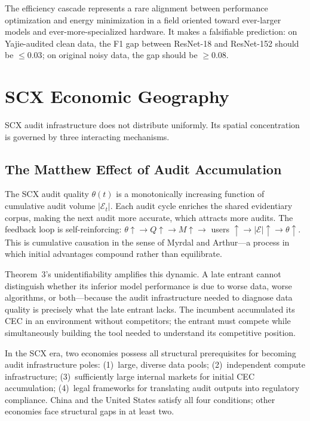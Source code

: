 \documentclass[twocolumn]{article}
\theoremstyle{definition}
\begin{document}
The efficiency cascade represents a rare alignment between performance optimization and energy minimization in a field oriented toward ever-larger models and ever-more-specialized hardware. It makes a falsifiable prediction: on Yajie-audited clean data, the F1 gap between ResNet-18 and ResNet-152 should be $\leq 0.03$; on original noisy data, the gap should be $\geq 0.08$.

\section{SCX Economic Geography}
\label{sec:geography}

SCX audit infrastructure does not distribute uniformly. Its spatial concentration is governed by three interacting mechanisms.

\subsection{The Matthew Effect of Audit Accumulation}

The SCX audit quality $\theta(t)$ is a monotonically increasing function of cumulative audit volume $|\mathcal{E}_t|$. Each audit cycle enriches the shared evidentiary corpus, making the next audit more accurate, which attracts more audits. The feedback loop is self-reinforcing: $\theta \uparrow \to Q \uparrow \to M \uparrow \to$ users $\uparrow \to |\mathcal{E}| \uparrow \to \theta \uparrow$. This is cumulative causation in the sense of Myrdal and Arthur---a process in which initial advantages compound rather than equilibrate.

Theorem~3's unidentifiability amplifies this dynamic. A late entrant cannot distinguish whether its inferior model performance is due to worse data, worse algorithms, or both---because the audit infrastructure needed to diagnose data quality is precisely what the late entrant lacks. The incumbent accumulated its CEC in an environment without competitors; the entrant must compete while simultaneously building the tool needed to understand its competitive position.

In the SCX era, two economies possess all structural prerequisites for becoming audit infrastructure poles: (1)~large, diverse data pools; (2)~independent compute infrastructure; (3)~sufficiently large internal markets for initial CEC accumulation; (4)~legal frameworks for translating audit outputs into regulatory compliance. China and the United States satisfy all four conditions; other economies face structural gaps in at least two.
\end{document}
